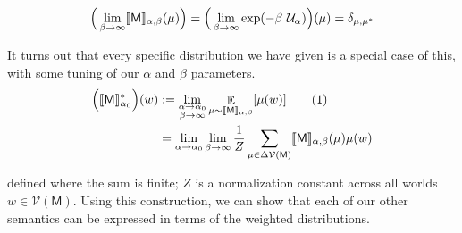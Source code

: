 \documentclass{article}
\newcommand\numberthis{\addtocounter{equation}{1}\tag{\theequation}}
\newcommand{\V}{\mathcal V}
\newcommand{\sfM}{\mathsf M}
\numberwithin{equation}{section}
\begin{document}
\begin{notfocus}
{%
	\[ \Big(\lim_{\beta \to \infty} \bbr{\sfM}_{\alpha,\beta}(\mu)
        \Big)  = \Big(\lim_{\beta \to \infty} \exp(-\beta\ \mathcal
        U_\alpha) \Big)(\mu) = \delta_{\mu, \mu^*} \] 
	
	It turns out that every specific distribution we have given is a special case of this, with some tuning of our $\alpha$ and $\beta$ parameters. 
	\begin{align*}
		\Big(\bbr{\sfM}_{\alpha_0}^*\Big)(w) &:= \lim_{\substack{\alpha \to \alpha_0 \\ \beta \to \infty}} 
		\E_{\mu \sim \bbr{\sfM}_{\alpha,\beta}} [\mu(w)] \numberthis\label{eqn:higher-expectation} \\
		&= \lim_{\alpha \to \alpha_0 } \lim_{\beta \to \infty}  \frac{1}{Z} \sum_{\mu \in \Delta\V(\sfM)} \bbr{\sfM}_{\alpha,\beta}(\mu) \mu(w) 
	\end{align*}
	
	defined where the sum is finite; $Z$ is a normalization constant across all worlds $w \in \V(\sfM)$. 
	Using this construction, we can show that each of our other semantics can be expressed in terms of the weighted distributions.
	
}
\end{notfocus}
\end{document}
